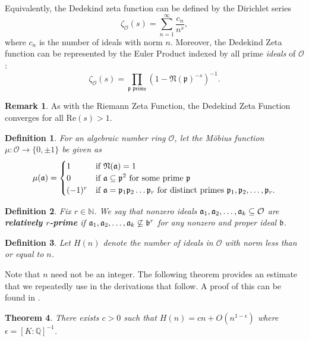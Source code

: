 \documentclass[12pt]{amsart}
\newtheorem{theorem}{Theorem}[subsection]
\newtheorem{definition}[theorem]{Definition}
\theoremstyle{definition}
\newtheorem*{remark}{Remark}
\newcommand{\f}[1]{\mathfrak{#1}}
\begin{document}
Equivalently, the Dedekind zeta function can be defined by the Dirichlet series
$$\zeta_\mathcal{O}(s)=\sum_{n=1}^{\infty}\frac{c_n}{n^s},$$
where $c_n$ is the number of ideals with norm $n$. Moreover, the Dedekind Zeta function can be represented by the Euler Product indexed by all prime \textit{ideals} of $\mathcal{O}$:
$$\zeta_{\mathcal{O}}(s)=\prod_{\f{p \text{ prime}}}(1-\f{N(p)}^{-s})^{-1}.$$

\begin{remark}
	As with the Riemann Zeta Function, the Dedekind Zeta Function converges for all \(\text{Re} (s)>1\).
\end{remark}

\begin{definition} For an algebraic number ring $\mathcal{O}$, let the M\"obius function $\mu:\mathcal{O}\to \{0,\pm 1\}$ be given as
	\begin{equation*}
		\mu(\f{a})=\begin{cases}
			1 & \text{if \(\f{\mathfrak{N}(a)}=1\)}\\
			0 & \text{if \(\f{a\subseteq \f{p}}^2\) for some prime \(\f{p}\) }\\
			(-1)^r & \text{if \(\f{a}=\f{p}_1 \f{p}_2\mathellipsis\f{p}_r\) for distinct primes \( \f{p}_1,\f{p}_2,\mathellipsis, \f{p}_r\)}.
		\end{cases}
	\end{equation*}
\end{definition}

\begin{definition} Fix $r \in \mathbb{N}$. We say that nonzero ideals \(\f{a}_1,\f{a}_2,\mathellipsis,\f{a}_k \subseteq \mathcal{O}\)  are \textbf{relatively \(r\)-prime} if \(\f{a}_1,\f{a}_2,\mathellipsis,\f{a}_k\not\subseteq \f{b}^r\) for any nonzero and proper ideal \(\f{b}\).
\end{definition}

\begin{definition} \label{H}
	Let $H(n)$ denote the number of ideals in $\mathcal{O}$ with norm less than or equal to $n$.
\end{definition}

Note that $n$ need not be an integer. The following theorem provides an estimate that we repeatedly use in the derivations that follow. A proof of this can be found in \cite{Marcus}.

\begin{theorem} There exists $c > 0$ such that $H(n)=cn+O(n^{1-\epsilon})$ where $\epsilon = [K : \mathbb{Q}]^{-1}$. \label{H-estimate}
\end{theorem}
\end{document}
